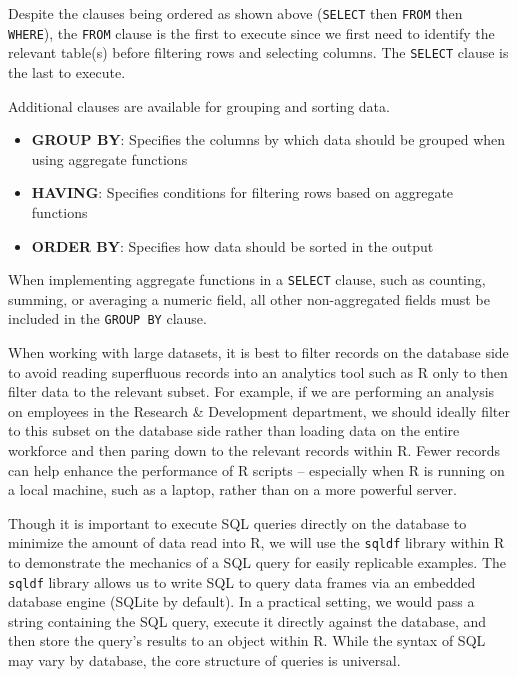 \documentclass[
]{book}
\providecommand{\tightlist}{%
  \setlength{\itemsep}{0pt}\setlength{\parskip}{0pt}}
\begin{document}
Despite the clauses being ordered as shown above (\texttt{SELECT} then \texttt{FROM} then \texttt{WHERE}), the \texttt{FROM} clause is the first to execute since we first need to identify the relevant table(s) before filtering rows and selecting columns. The \texttt{SELECT} clause is the last to execute.

Additional clauses are available for grouping and sorting data.

\begin{itemize}
\tightlist
\item
  \textbf{GROUP BY}: Specifies the columns by which data should be grouped when using aggregate functions
\item
  \textbf{HAVING}: Specifies conditions for filtering rows based on aggregate functions
\item
  \textbf{ORDER BY}: Specifies how data should be sorted in the output
\end{itemize}

When implementing aggregate functions in a \texttt{SELECT} clause, such as counting, summing, or averaging a numeric field, all other non-aggregated fields must be included in the \texttt{GROUP\ BY} clause.

When working with large datasets, it is best to filter records on the database side to avoid reading superfluous records into an analytics tool such as R only to then filter data to the relevant subset. For example, if we are performing an analysis on employees in the Research \& Development department, we should ideally filter to this subset on the database side rather than loading data on the entire workforce and then paring down to the relevant records within R. Fewer records can help enhance the performance of R scripts -- especially when R is running on a local machine, such as a laptop, rather than on a more powerful server.

Though it is important to execute SQL queries directly on the database to minimize the amount of data read into R, we will use the \texttt{sqldf} library within R to demonstrate the mechanics of a SQL query for easily replicable examples. The \texttt{sqldf} library allows us to write SQL to query data frames via an embedded database engine (SQLite by default). In a practical setting, we would pass a string containing the SQL query, execute it directly against the database, and then store the query's results to an object within R. While the syntax of SQL may vary by database, the core structure of queries is universal.
\end{document}
